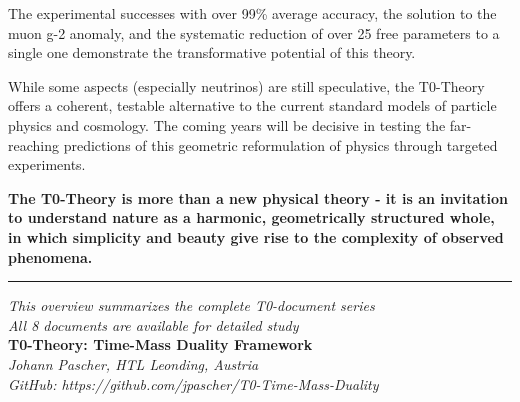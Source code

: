 \documentclass[12pt,a4paper]{article}
\begin{document}
	The experimental successes with over 99\% average accuracy, the solution to the muon g-2 anomaly, and the systematic reduction of over 25 free parameters to a single one demonstrate the transformative potential of this theory.
	
	While some aspects (especially neutrinos) are still speculative, the T0-Theory offers a coherent, testable alternative to the current standard models of particle physics and cosmology. The coming years will be decisive in testing the far-reaching predictions of this geometric reformulation of physics through targeted experiments.
	
	\textbf{The T0-Theory is more than a new physical theory - it is an invitation to understand nature as a harmonic, geometrically structured whole, in which simplicity and beauty give rise to the complexity of observed phenomena.}
	
	\vfill
	
	\begin{center}
		\hrule
		\vspace{0.5cm}
		\textit{This overview summarizes the complete T0-document series}\\
		\textit{All 8 documents are available for detailed study}\\
		\vspace{0.3cm}
		\textbf{T0-Theory: Time-Mass Duality Framework}\\
		\textit{Johann Pascher, HTL Leonding, Austria}\\
		\textit{GitHub: https://github.com/jpascher/T0-Time-Mass-Duality}
		\vspace{0.3cm}
	\end{center}
	
\end{document}
